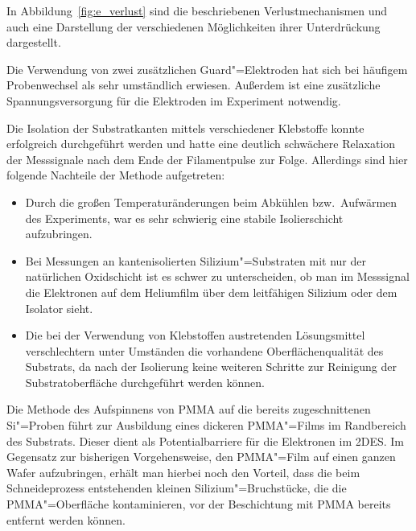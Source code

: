 In Abbildung~\ref{fig:e_verlust} sind die beschriebenen Verlustmechanismen und auch eine Darstellung der verschiedenen Möglichkeiten ihrer Unterdrückung dargestellt.

Die Verwendung von zwei zusätzlichen Guard"=Elektroden hat sich bei häufigem Probenwechsel als sehr umständlich erwiesen. Außerdem ist eine zusätzliche Spannungsversorgung für die Elektroden im Experiment notwendig.

Die Isolation der Substratkanten mittels verschiedener Klebstoffe konnte erfolgreich durchgeführt werden und hatte eine deutlich schwächere Relaxation der Messsignale nach dem Ende der Filamentpulse zur Folge. Allerdings sind hier folgende Nachteile der Methode aufgetreten:
\begin{itemize}
    \item Durch die großen Temperaturänderungen beim Abkühlen bzw.\ Aufwärmen des Experiments, war es sehr schwierig eine stabile Isolierschicht aufzubringen.
    \item Bei Messungen an kantenisolierten Silizium"=Substraten mit nur der natürlichen Oxidschicht ist es schwer zu unterscheiden, ob man im Messsignal die Elektronen auf dem Heliumfilm über dem leitfähigen Silizium oder dem Isolator sieht.
    \item Die bei der Verwendung von Klebstoffen austretenden Lösungsmittel verschlechtern unter Umständen die vorhandene Oberflächenqualität des Substrats, da nach der Isolierung keine weiteren Schritte zur Reinigung der Substratoberfläche durchgeführt werden können.
\end{itemize}

Die Methode des Aufspinnens von PMMA auf die bereits zugeschnittenen Si"=Proben führt zur Ausbildung eines dickeren PMMA"=Films im Randbereich des Substrats. Dieser dient als Potentialbarriere für die Elektronen im 2DES. Im Gegensatz zur bisherigen Vorgehensweise, den PMMA"=Film auf einen ganzen Wafer aufzubringen, erhält man hierbei noch den Vorteil, dass die beim Schneideprozess entstehenden kleinen Silizium"=Bruchstücke, die die PMMA"=Oberfläche kontaminieren, vor der Beschichtung mit PMMA bereits entfernt werden können.
 
